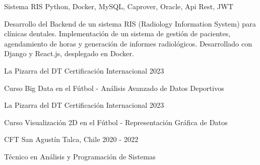 \documentclass[]{awesome-cv}
\begin{document}
\begin{cventries}
	\vspace{-3mm}
	\cventry
	{}
	{Sistema RIS \vspace{-5mm}}
	{Python, Docker, MySQL, Caprover, Oracle, Api Rest, JWT \vspace{-5mm}}
	{}
	{\begin{cvsectionnormaltext}
		\item {Desarrollo del Backend de un sistema RIS (Radiology Information System) para clínicas dentales. Implementación de un sistema de gestión de pacientes, agendamiento de horas y generación de informes radiológicos. Desarrollado con Django y React.js, desplegado en Docker.
		}
	\end{cvsectionnormaltext}}
	
	\vspace{-5mm}
	
\end{cventries}

\vspace{4mm}
\begin{cventries}
	\vspace{-3mm}
	\cventry
	{}
	{La Pizarra del DT \vspace{-5mm}}
	{Certificación Internacional \vspace{-5mm}}
	{2023 \vspace{-5mm}}
	{\begin{cvsectionnormaltext} 
		\item{Curso Big Data en el Fútbol - Análisis Avanzado de Datos Deportivos}
	\end{cvsectionnormaltext}}

	\vspace{-3mm}
	\cventry
	{}
	{La Pizarra del DT \vspace{-5mm}}
	{Certificación Internacional \vspace{-5mm}}
	{2023 \vspace{-5mm}}
	{\begin{cvsectionnormaltext} 
		\item{Curso Visualización 2D en el Fútbol - Representación Gráfica de Datos}
	\end{cvsectionnormaltext}}

	\vspace{-3mm}
	\cventry
	{}
	{CFT San Agustín \vspace{-5mm}}
	{Talca, Chile \vspace{-5mm}}
	{2020 - 2022 \vspace{-5mm}}
	{\begin{cvsectionnormaltext} 
		\item{Técnico en Análisis y Programación de Sistemas}
	\end{cvsectionnormaltext}}
\end{cventries}
\end{document}
